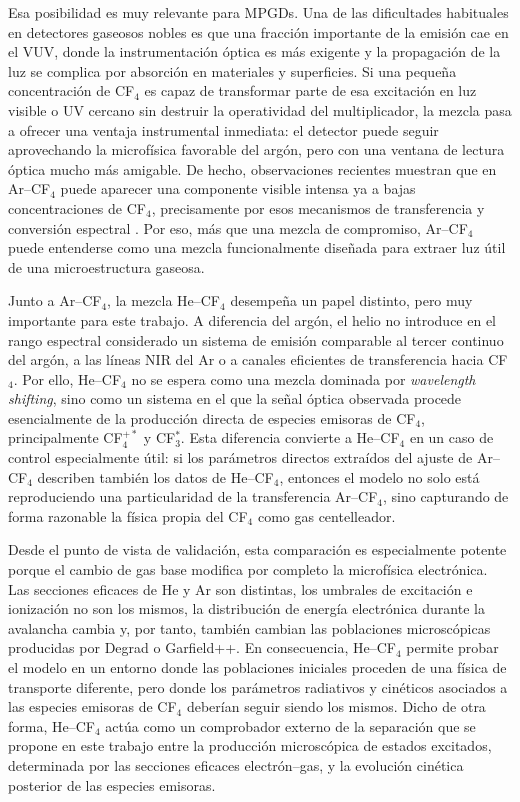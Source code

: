 \documentclass[12pt,a4paper]{article}
\begin{document}
Esa posibilidad es muy relevante para MPGDs. Una de las dificultades habituales en detectores gaseosos nobles es que una fracción importante de la emisión cae en el VUV, donde la instrumentación óptica es más exigente y la propagación de la luz se complica por absorción en materiales y superficies. Si una pequeña concentración de CF$_4$ es capaz de transformar parte de esa excitación en luz visible o UV cercano sin destruir la operatividad del multiplicador, la mezcla pasa a ofrecer una ventaja instrumental inmediata: el detector puede seguir aprovechando la microfísica favorable del argón, pero con una ventana de lectura óptica mucho más amigable. De hecho, observaciones recientes muestran que en Ar--CF$_4$ puede aparecer una componente visible intensa ya a bajas concentraciones de CF$_4$, precisamente por esos mecanismos de transferencia y conversión espectral \cite{amedo2023observation,amedo2023scintillation,veenhof2025primary}. Por eso, más que una mezcla de compromiso, Ar--CF$_4$ puede entenderse como una mezcla funcionalmente diseñada para extraer luz útil de una microestructura gaseosa.

Junto a Ar--CF$_4$, la mezcla He--CF$_4$ desempeña un papel distinto, pero muy importante para este trabajo. A diferencia del argón, el helio no introduce en el rango espectral considerado un sistema de emisión comparable al tercer continuo del argón, a las líneas NIR del Ar o a canales eficientes de transferencia hacia CF$_4$. Por ello, He--CF$_4$ no se espera como una mezcla dominada por \emph{wavelength shifting}, sino como un sistema en el que la señal óptica observada procede esencialmente de la producción directa de especies emisoras de CF$_4$, principalmente CF$_4^{+*}$ y CF$_3^*$. Esta diferencia convierte a He--CF$_4$ en un caso de control especialmente útil: si los parámetros directos extraídos del ajuste de Ar--CF$_4$ describen también los datos de He--CF$_4$, entonces el modelo no solo está reproduciendo una particularidad de la transferencia Ar--CF$_4$, sino capturando de forma razonable la física propia del CF$_4$ como gas centelleador.

Desde el punto de vista de validación, esta comparación es especialmente potente porque el cambio de gas base modifica por completo la microfísica electrónica. Las secciones eficaces de He y Ar son distintas, los umbrales de excitación e ionización no son los mismos, la distribución de energía electrónica durante la avalancha cambia y, por tanto, también cambian las poblaciones microscópicas producidas por Degrad o Garfield++. En consecuencia, He--CF$_4$ permite probar el modelo en un entorno donde las poblaciones iniciales proceden de una física de transporte diferente, pero donde los parámetros radiativos y cinéticos asociados a las especies emisoras de CF$_4$ deberían seguir siendo los mismos. Dicho de otra forma, He--CF$_4$ actúa como un comprobador externo de la separación que se propone en este trabajo entre la producción microscópica de estados excitados, determinada por las secciones eficaces electrón--gas, y la evolución cinética posterior de las especies emisoras.
\end{document}
